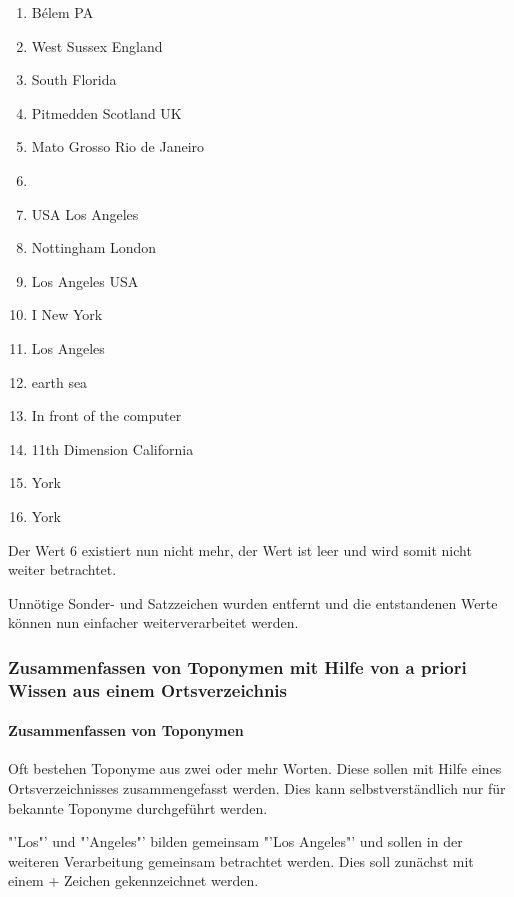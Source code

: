 				\begin{multicols}{2}
					\begin{enumerate}
						\item Bélem PA
						\item West Sussex England
						\item South Florida
						\item Pitmedden Scotland UK
						\item Mato Grosso Rio de Janeiro
						\item 
						\item USA Los Angeles
						\item Nottingham London
						\item Los Angeles USA
						\item I New York 
						\item Los Angeles
						\item earth sea
						\item In front of the computer
						\item 11th Dimension California
						\item York
						\item York
					\end{enumerate}
				\end{multicols}

				Der Wert 6 existiert nun nicht mehr, der Wert ist leer und wird somit nicht weiter betrachtet.

				Unnötige Sonder- und Satzzeichen wurden entfernt und die entstandenen Werte können nun einfacher weiterverarbeitet werden.

			\subsubsection{Zusammenfassen von Toponymen mit Hilfe von a priori Wissen aus einem Ortsverzeichnis}

				\paragraph{Zusammenfassen von Toponymen}

				Oft bestehen Toponyme aus zwei oder mehr Worten.
				Diese sollen mit Hilfe eines Ortsverzeichnisses zusammengefasst werden. 
				Dies kann selbstverständlich nur für bekannte Toponyme durchgeführt werden.
				
				"'Los"' und "'Angeles"' bilden gemeinsam "'Los Angeles"' und sollen in der weiteren Verarbeitung gemeinsam betrachtet werden. 
				Dies soll zunächst mit einem + Zeichen gekennzeichnet werden.

